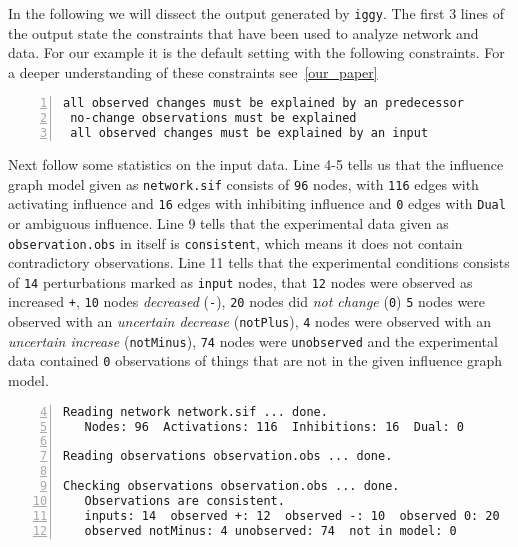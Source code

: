 \documentclass{article}
\newcommand\iggy{\texttt{iggy}}
\begin{document}
In the following we will dissect the output generated by \iggy.
The first 3 lines of the output state the constraints that have been used to analyze network and data.
For our example it is the default setting with the following constraints.
For a deeper understanding of these constraints see~\ref{our_paper}

\begin{Verbatim}[frame=single,numbers=left]
 all observed changes must be explained by an predecessor
 no-change observations must be explained
 all observed changes must be explained by an input
\end{Verbatim}

Next follow some statistics on the input data. 
Line 4-5 tells us that the influence graph model given as \texttt{network.sif} 
consists of \texttt{96} nodes, 
with \texttt{116} edges with activating influence 
and \texttt{16} edges with inhibiting influence
and \texttt{0} edges with \texttt{Dual} or ambiguous influence.
%
Line 9 tells that the experimental data given as \texttt{observation.obs} in itself is \texttt{consistent},
which means it does not contain contradictory observations.
Line 11 tells that the experimental conditions consists of \texttt{14} perturbations marked as \texttt{input} nodes, 
that \texttt{12} nodes were observed as increased \texttt{+}, 
\texttt{10} nodes \emph{decreased} (\texttt{-}),
\texttt{20} nodes did \emph{not change} (\texttt{0})
\texttt{5} nodes were observed with an \emph{uncertain decrease} (\texttt{notPlus}),
\texttt{4} nodes were observed with an \emph{uncertain increase} (\texttt{notMinus}),
\texttt{74} nodes were \texttt{unobserved} and the experimental data contained \texttt{0} observations of things that are not in the given influence graph model.

\begin{Verbatim}[frame=single,numbers=left,firstnumber=4] 
Reading network network.sif ... done.
   Nodes: 96  Activations: 116  Inhibitions: 16  Dual: 0

Reading observations observation.obs ... done.

Checking observations observation.obs ... done.
   Observations are consistent.
   inputs: 14  observed +: 12  observed -: 10  observed 0: 20  observed notPlus: 5  
   observed notMinus: 4 unobserved: 74  not in model: 0
\end{Verbatim}
\end{document}

